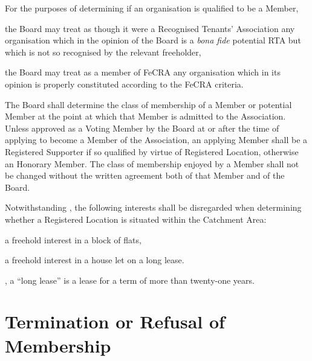 \documentclass[10pt]{mk-articles-of-association}
\newcommand{\EC}[0]{Board}
\newcommand{\Exec}[0]{\EC{} }
\newcommand{\RTA}[0]{Recognised Tenants' Association}
\begin{document}
\begin{constenum}
  \item For the purposes of determining if an organisation is qualified
    to be a Member,
    \begin{constenum}
      \item
        the \Exec may treat as though it were a \RTA{} any organisation which in
        the opinion of the \Exec is a \textit{bona fide} potential RTA
        but which is not so recognised by the relevant
        freeholder, \ITand
      \item the \Exec may treat as a member of FeCRA any
        organisation which in its opinion is properly constituted according
        to the FeCRA criteria.
    \end{constenum}


  \item The \Exec shall determine the class of membership of a Member
    or potential Member at the point at which that Member is admitted
    to the Association. Unless approved as a Voting Member by the
    \Exec at or after the time of applying to become a Member of the
    Association, an applying Member shall be a Registered Supporter if
    so qualified by virtue of Registered Location, otherwise an
    Honorary Member.  The class of membership enjoyed by a Member
    shall not be changed without the written agreement both of that
    Member and of the \EC{}.

  \item Notwithstanding , the following interests
    shall be disregarded when determining whether a Registered Location
    is situated within the Catchment Area:
    \begin{constenum}
      \item a freehold interest in a block of flats, \ITor
      \item a freehold interest in a house let on a long lease.
    \end{constenum}

    \avoiddoubt, a ``long lease'' is a lease for a term of more than
    twenty-one years.


\end{constenum}


\section{Termination or Refusal of Membership}
\end{document}

